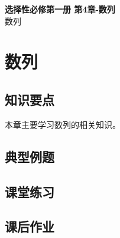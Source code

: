 \documentclass[12pt,a4paper]{article}
\begin{document}
\begin{center}
\LARGE\textbf{选择性必修第一册 第4章-数列} \\[0.5em]
\large 数列
\end{center}

\tableofcontents
\newpage

\section{数列}

\subsection{知识要点}
本章主要学习数列的相关知识。

\subsection{典型例题}

\subsection{课堂练习}

\subsection{课后作业}
\end{document}
